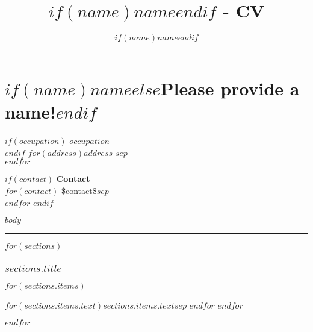 \documentclass[11pt,a4paper]{scrartcl}
\author{$if(name)$$name$$endif$}
\title{$if(name)$$name$$endif$ - CV}
\begin{document}
\color{TextColor}

\part*{$if(name)$$name$$else$Please provide a name!$endif$}

\begin{minipage}[t]{0.48\textwidth}
$if(occupation)$
\textbf{$occupation$} \\
$endif$
$for(address)$$address$ $sep$ \\$endfor$
\end{minipage}%
\begin{minipage}[t]{0.48\textwidth}
\begin{flushright}
$if(contact)$
  \textbf{Contact} \\
    $for(contact)$
    \url{$contact$}$sep$ \\
    $endfor$
$endif$
\end{flushright}
\end{minipage}

$body$

{\color{AccentColor}\rule{\linewidth}{0.5mm}}

$for(sections)$
\section*{$sections.title$}

\begin{description}

$for(sections.items)$
\item [$if(sections.items.label)$$sections.items.label$$endif$] $for(sections.items.text)$$sections.items.text$$sep$ \newline $endfor$ 
$endfor$

\end{description}
$endfor$
\end{document}
